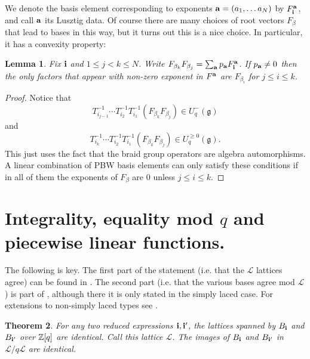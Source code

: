 \documentclass[11pt]{amsart}
\numberwithin{equation}{section}
\newtheorem{Theorem}{Theorem}[section]
\newtheorem{Lemma}[Theorem]{Lemma}
\theoremstyle{definition}
\newcommand{\g}{\mathfrak{g}}
\begin{document}
We denote the basis element corresponding to exponents ${\bf a}= (a_1, \ldots a_N)$ by $F^{\bf a}_{\bf i}$, and call ${\bf a}$ its Lusztig data.
Of course there are many choices of root vectors $F_\beta$ that lead to bases in this way, but it turns out this is a nice choice. In particular, it has a convexity property:

\begin{Lemma} Fix ${\bf i}$ and $ 1 \leq j < k \leq N$. 
Write $F_{\beta_k} F_{\beta_j} = \sum_{\bf a} p_{\bf a} F^{\bf a}_{\bf i}$. If $p_{\bf a}\neq 0$ then the only factors that appear with non-zero exponent in $F^{\bf a}$ are $F_{\beta_i}$ for $j \leq i \leq k$.
\end{Lemma}

\begin{proof}
Notice that
$$T_{i_{j-1}}^{-1} \cdots T_{i_2}^{-1} T_{i_1}^{-1} (F_{\beta_k} F_{\beta_j}) \in U_q^-(\g)$$
and
$$T_{i_{k}}^{-1} \cdots T_{i_2}^{-1} T_{i_1}^{-1} (F_{\beta_k} F_{\beta_j}) \in U_q^{\geq 0}(\g).$$
This just uses the fact that the braid group operators are algebra automorphisms. A linear combination of PBW basis elements can only satisfy these conditions if in all of them the exponents of $F_\beta$ are $0$ unless $j \leq i \leq k$. 
\end{proof}
%

\section{Integrality, equality mod $q$ and piecewise linear functions.}

The following is key. The first part of the statement (i.e. that the $\mathcal{L}$ lattices agree) can be found in \cite[Proposition 41.1.4]{L:1993}. The second part (i.e. that the various bases agree mod $\mathcal{L}$) is part of  \cite[Proposition 42. 1.5]{L:1993}, although there it is only stated in the simply laced case.  For extensions to non-simply laced types see \cite{Sai}.

\begin{Theorem} \label{th51}
For any two reduced expressions ${\bf i}, {\bf i'}$, the lattices spanned by $B_{\bf i}$ and $B_{\bf i'}$ over ${\Bbb Z}[q]$ are identical. Call this lattice $\mathcal{L}$. The images of $B_{\bf i}$ and $B_{\bf i'}$ in $\mathcal{L}/q \mathcal{L}$ are identical. 
\end{Theorem}
\end{document}
